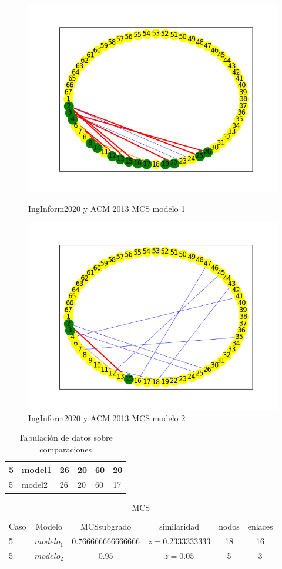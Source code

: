 \begin{figure}[H]
\centering
\includegraphics[width=0.7\linewidth]{images/pucp/H_pucp2020_cmp_acm2013_m1_mcs_mix.png}
\caption{IngInform2020 y ACM 2013 MCS modelo 1}
\label{fig:c5p2modelo1}


\includegraphics[width=0.7\linewidth]{images/pucp/H_pucp2020_cmp_acm2013_m2_mcs_mix.png}
\caption{IngInform2020 y ACM 2013 MCS modelo 2}
\label{fig:c5p2modelo2}

\end{figure}


\begin{table}[H]
\centering
\caption{Tabulación de datos sobre comparaciones}
\begin{tabular}[t]{|l|l|l|l|l|l|}
\hline
5&model1&26&20&60&20\\
\hline
5&model2&26&20&60&17\\
\hline
\end{tabular}
\label{tab:tabcomparaciones_C5}
\end{table}


\begin{table}[H]
\centering
\caption{MCS}
\begin{tabular}[t]{lccccc}
\hline
Caso & Modelo & MCSsubgrado & similaridad & nodos & enlaces \\
5 & $modelo_1$ & 0.766666666666666 & $z=0.2333333333$ & 18 & 16\\
5 & $modelo_2$ & 0.95 & $z=0.05$ & 5 & 3\\
\hline
\end{tabular}
\label{tab:tabcomparaciones_C5}
\end{table}

